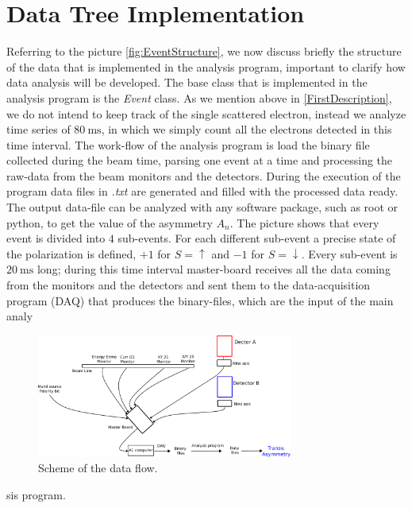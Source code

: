 \newpage
\section{Data Tree Implementation}

Referring to the picture \ref{fig:EventStructure}, we now discuss briefly the structure of the data that is implemented in the analysis program, important to clarify how data analysis will be developed.
The base class that is implemented in the analysis program is the \textit{Event} class. As we mention above in \ref{FirstDescription}, we do not intend to keep track of the single scattered electron, instead we analyze time series of $\SI{80}{\milli \second}$, in which we simply count all the electrons detected in this time interval. The work-flow of the analysis program is load the binary file collected during the beam time, parsing  one event at a time and processing the raw-data from the beam monitors and the detectors. During the execution of the program data files in \textit{.txt} are generated and filled with the processed data ready. The output data-file can be analyzed with any software package, such as root or python, to get the value of the asymmetry $A_{n}$. 
The picture shows that every event is divided into $4$ sub-events. For each different sub-event a precise state of the polarization is defined, 
$+1$ for $S = \uparrow$ and $-1$ for $S = \downarrow$. Every sub-event is $\SI{20}{\milli \second}$ long; during this time interval master-board receives all the data coming from the monitors and the detectors and sent them to the data-acquisition program (DAQ) that produces the binary-files, which are the input of the main analy\begin{figure}[hbtp]

\centering
\includegraphics[width = 0.75\textwidth]{Analysis/Electronic_scheme.pdf}
\caption{Scheme of the data flow.}
\end{figure}
sis program.

